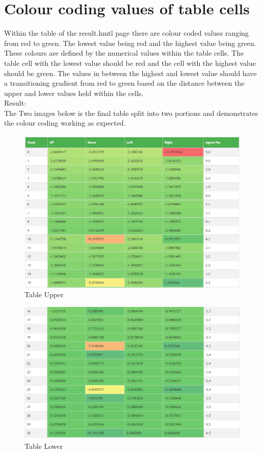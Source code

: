 \section{Colour coding values of table cells}
Within the table of the result.hmtl page there are colour coded values ranging from red to green. The lowest value being red and the highest value being green. These colours are defined by the numerical values within the table cells. The table cell with the lowest value should be red and the cell with the highest value should be green. The values in between the highest and lowest value should have a transitioning gradient from red to green based on the distance between the upper and lower values held within the cells.\\
Result:\\
The Two images below is the final table split into two portions and demonstrates the colour coding working as expected.
\begin{figure}[H]
	\centering
	\includegraphics[width=0.7\linewidth]{img/colour1}
	\caption{Table Upper}
	\label{fig:colour1}
\end{figure}
 \begin{figure}[H]
 	\centering
 	\includegraphics[width=0.7\linewidth]{img/Colour2}
 	\caption{Table Lower}
 	\label{fig:colour2}
 \end{figure}
 
